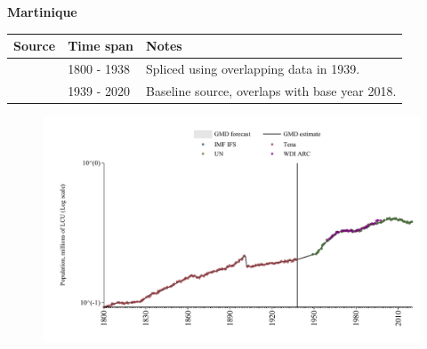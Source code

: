 \documentclass[12pt,a4paper,landscape]{article}
\begin{document}
\begin{adjustbox}{max totalsize={\paperwidth}{\paperheight},center}
\begin{minipage}[t][\textheight][t]{\textwidth}
\vspace*{0.5cm}
{}
\begin{center}
{\Large\bfseries Martinique}
\end{center}
\vspace{0.5cm}
\begin{table}[H]
\centering
\small
\begin{tabular}{|l|l|l|}
\hline
\textbf{Source} & \textbf{Time span} & \textbf{Notes} \\
\hline
\rowcolor{white}\cite{Tena}& 1800 - 1938 &Spliced using overlapping data in 1939.\\
\rowcolor{lightgray}\cite{IMF_IFS}& 1939 - 2020 &Baseline source, overlaps with base year 2018.\\
\hline
\end{tabular}
\end{table}
\begin{figure}[H]
\centering
\includegraphics[width=\textwidth,height=0.6\textheight,keepaspectratio]{graphs/MTQ_pop.pdf}
\end{figure}
\end{minipage}
\end{adjustbox}
\end{document}
